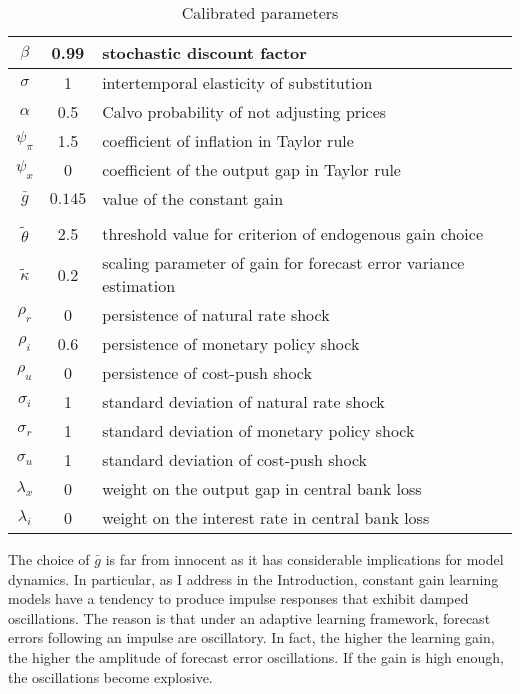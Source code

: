 \documentclass[11pt]{article}
\renewcommand{\[}{\begin{equation}}
\renewcommand{\]}{\end{equation}}
\begin{document}
\begin{center}
\begin{table}
\begin{tabular}{ c | c  | l }
 $\beta$ & 0.99 & stochastic discount factor \\  \hline
 $\sigma$ & 1  & intertemporal elasticity of substitution \\  \hline
 $\alpha$ & 0.5 &  Calvo probability of not adjusting prices \\\hline
 $\psi_{\pi} $& 1.5  & coefficient of inflation in Taylor rule \\\hline
 $\psi_x$ & 0   & coefficient of the output gap in Taylor rule  \\\hline
 $\bar{g}$ & $0.145$  & value of the constant gain \\\hline
& & \\ [-1em] %
 $\tilde{\theta}$ &  2.5  & threshold value for criterion of endogenous gain choice \\ \hline
  $\tilde{\kappa}$ &  0.2  & scaling parameter of gain for forecast error variance estimation \\ \hline
    $\rho_r$ & 0 &   persistence of natural rate shock \\ \hline
    $\rho_i$ & 0.6 &  persistence of monetary policy shock  \\ \hline
    $\rho_u$ & 0  &  persistence of cost-push shock  \\ \hline
    $\sigma_i$ & 1 & standard deviation of natural rate shock  \\ \hline
    $\sigma_r$ &  1  &standard deviation of monetary policy shock  \\ \hline
    $\sigma_u$ & 1 & standard deviation of cost-push shock   \\ \hline  
    $\lambda_x$ & 0 & weight on the output gap in central bank loss   \\ \hline  
    $\lambda_i$ & 0 & weight on the interest rate in central bank loss   \\ \hline  
\end{tabular}     
      \caption{Calibrated parameters}  \label{calibration}
 \end{table}
\end{center}

\vspace{-1.4cm}

The choice of $\bar{g}$ is far from innocent as it has considerable implications for model dynamics. In particular, as I address in the Introduction, constant gain learning models have a tendency to produce impulse responses that exhibit damped oscillations. The reason is that under an adaptive learning framework, forecast errors following an impulse are oscillatory. In fact, the higher the learning gain, the higher the amplitude of forecast error oscillations. If the gain is high enough, the oscillations become explosive. 
\end{document}
